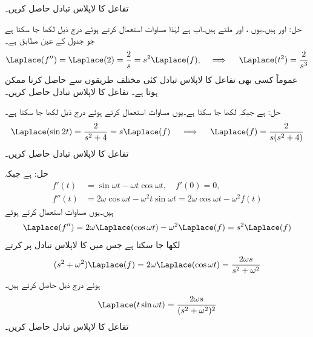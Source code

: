 تفاعل  کا لاپلاس تبادل حاصل کریں۔

حل: اور  ہیں۔یوں ،  اور  ملتے ہیں۔اب  ہے لہٰذا  مساوات  استعمال کرتے ہوئے درج ذیل لکھا جا سکتا ہے جو جدول  کے عین مطابق ہے۔
\begin{align*}
\Laplace(f'')=\Laplace(2)=\frac{2}{s}=s^2\Laplace(f), \quad \implies \quad \Laplace(t^2)=\frac{2}{s^3}
\end{align*}
عموماً کسی بھی تفاعل کا لاپلاس تبادل کئی مختلف طریقوں سے حاصل کرنا ممکن ہوتا ہے۔
تفاعل  کا لاپلاس تبادل حاصل کریں۔

حل: ہے جبکہ  لکھا جا سکتا ہے۔یوں مساوات  استعمال کرتے ہوئے درج ذیل لکھا جا سکتا ہے۔ 
\begin{align*}
\Laplace(\sin 2t)=\frac{2}{s^2+4}=s\Laplace(f) \quad \implies \quad \Laplace(f)=\frac{2}{s(s^2+4)}
\end{align*}
تفاعل  کا لاپلاس تبادل حاصل کریں۔

حل: ہے جبکہ
\begin{align*}
f'(t)&=\sin \omega t-\omega t\cos \omega t, \quad f'(0)=0,\\
f''(t)&=2\omega \cos \omega t-\omega^2 t \sin \omega t=2\omega \cos \omega t-\omega^2 f(t)
\end{align*}
ہیں۔یوں مساوات  استعمال کرتے ہوئے
\begin{align*}
\Laplace(f'')=2\omega \Laplace(\cos \omega t)-\omega^2\Laplace(f)=s^2\Laplace(f)
\end{align*}
لکھا جا سکتا ہے جس میں  کا لاپلاس تبادل پر کرتے 
\begin{align*}
(s^2+\omega^2)\Laplace(f)=2\omega \Laplace(\cos \omega t)=\frac{2\omega s}{s^2+\omega^2}
\end{align*}
ہوئے درج ذیل حاصل کرتے ہیں۔
\begin{align*}
\Laplace(t\sin \omega t)=\frac{2\omega s}{(s^2+\omega^2)^2}
\end{align*}
تفاعل  کا لاپلاس تبادل حاصل کریں۔

